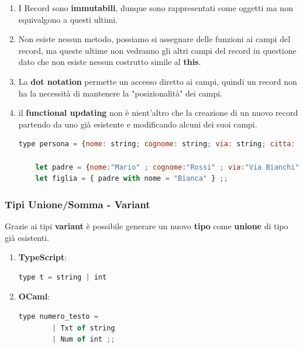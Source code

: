 \documentclass{article}
\begin{document}
\begin{enumerate}
    \item I Record sono \textbf{immutabili}, dunque sono rappresentati come oggetti ma non equivalgono a questi ultimi.
    \vspace*{15px}
    \item Non esiste nessun metodo, possiamo si assegnare delle funzioni ai campi del record, ma queste ultime non vedranno gli altri campi del record in questione dato che non esiste nessun costrutto simile al \textbf{this}.
    \vspace*{15px}
    \item La \textbf{dot notation} permette un accesso diretto ai campi, quindi un record non ha la necessità di mantenere la "posizionalità" dei campi.
    \vspace*{15px}
    \item il \textbf{functional updating} non è nient'altro che la creazione di un nuovo record partendo da uno già esistente e modificando alcuni dei suoi campi.
    \vspace*{10px}
\begin{lstlisting}[language = JavaScript]
    type persona = {nome: string; cognome: string; via: string; citta: string} ;;
    
    let padre = {nome:"Mario" ; cognome:"Rossi" ; via:"Via Bianchi" ; citta:"Roma"} ;;
    let figlia = { padre with nome = "Bianca" } ;;
\end{lstlisting}

\vspace*{-20px}
\end{enumerate}

\newpage

\subsubsection{Tipi Unione/Somma - Variant}

Grazie ai tipi \textbf{variant} è possibile generare un nuovo \textbf{tipo} come \textbf{unione} di tipo già esistenti. 
\begin{enumerate}
\item \textbf{TypeScript}: 
\vspace*{10px}
\begin{lstlisting}[language = JavaScript]
    type t = string | int
\end{lstlisting}
\vspace*{-20px}

\item \textbf{OCaml}: 
\vspace*{10px}
\begin{lstlisting}[language = JavaScript]
    type numero_testo =
        | Txt of string
        | Num of int ;;
\end{lstlisting}
\vspace*{-20px}
\end{enumerate}
\end{document}

